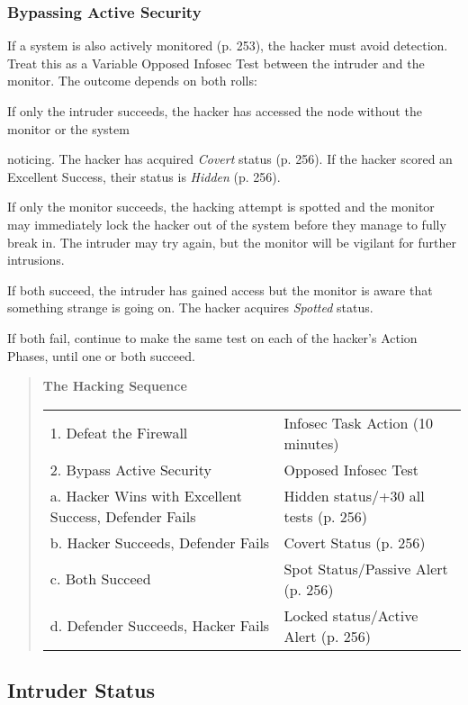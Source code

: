 \subsubsection{Bypassing Active Security} 

If a system is also actively monitored (p. 253), the hacker must avoid detection. Treat this as a Variable Opposed Infosec Test between the intruder and the monitor. The outcome depends on both rolls: 

If only the intruder succeeds, the hacker has accessed the node without the monitor or the system 

noticing. The hacker has acquired \textit{Covert} status (p. 256). If the hacker scored an Excellent Success, their status is \textit{Hidden }(p. 256). 

If only the monitor succeeds, the hacking attempt is spotted and the monitor may immediately lock the hacker out of the system before they manage to fully break in. The intruder may try again, but the monitor will be vigilant for further intrusions. 

If both succeed, the intruder has gained access but the monitor is aware that something strange is going on. The hacker acquires \textit{Spotted} status. 

If both fail, continue to make the same test on each of the hacker's Action Phases, until one or both succeed. 

\begin{quotation} \textbf{The Hacking Sequence} 

\begin{tabular}{ll} 1. Defeat the Firewall &Infosec Task Action (10 minutes) \\ 2. Bypass Active Security &Opposed Infosec Test \\ \indent a. Hacker Wins with Excellent Success, Defender Fails &Hidden status/+30 all tests (p. 256) \\ \indent b. Hacker Succeeds, Defender Fails &Covert Status (p. 256) \\ \indent c. Both Succeed &Spot Status/Passive Alert (p. 256) \\ \indent d. Defender Succeeds, Hacker Fails &Locked status/Active Alert (p. 256) \\ \end{tabular} \end{quotation} 

\subsection{Intruder Status} 

